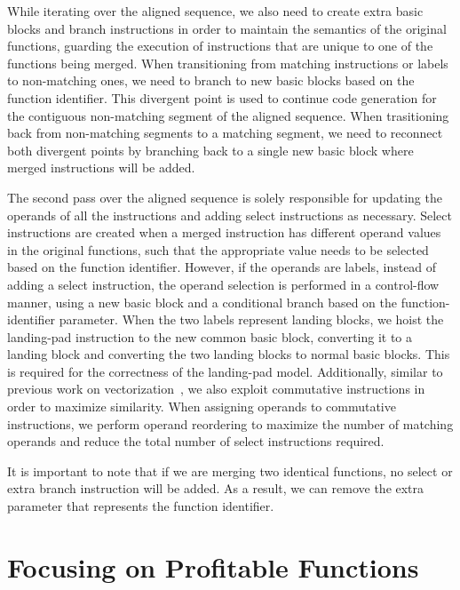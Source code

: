 While iterating over the aligned sequence, we also need to create extra basic
blocks and branch instructions in order to maintain the semantics of the
original functions, guarding the execution of instructions that are unique to
one of the functions being merged.
When transitioning from matching instructions or labels to non-matching ones,
we need to branch to new basic blocks based on the function identifier.
This divergent point is used to continue code generation for the contiguous
non-matching segment of the aligned sequence.
When trasitioning back from non-matching segments to a matching segment, we need
to reconnect both divergent points by branching back to a single new basic block
where merged instructions will be added.

The second pass over the aligned sequence is solely responsible for updating
the operands of all the instructions and adding select instructions as necessary.
Select instructions are created when a merged instruction has different operand
values in the original functions, such that the appropriate value needs to be
selected based on the function identifier.
However, if the operands are labels, instead of adding a select instruction,
the operand selection is performed in a control-flow manner, using a new basic
block and a conditional branch based on the function-identifier parameter.
When the two labels represent landing blocks, we hoist the landing-pad
instruction to the new common basic block, converting it to a landing block and
converting the two landing blocks to normal basic blocks.
This is required for the correctness of the landing-pad model.
Additionally, similar to previous work on vectorization~\cite{porpodas18}, we
also exploit commutative instructions in order to maximize similarity.
When assigning operands to commutative instructions, we perform operand
reordering to maximize the number of matching operands and reduce the total
number of select instructions required.

It is important to note that if we are merging two identical functions, no
select or extra branch instruction will be added.
As a result, we can remove the extra parameter that represents the function
identifier.

\section{Focusing on Profitable Functions}
\label{sec:framework}


